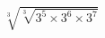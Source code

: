 \documentclass[preview]{standalone}
\begin{document}
\begin{align*}
{\sqrt[3]{\sqrt[3]{3^5 \times 3^6 \times 3^7}}}
\end{align*}
\end{document}

